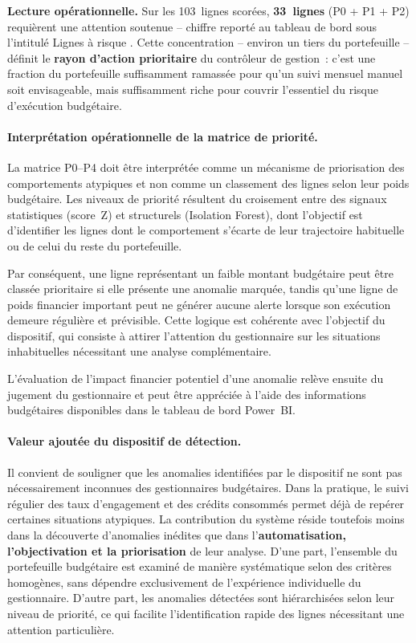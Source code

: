 \textbf{Lecture op\'erationnelle.} Sur les 103~lignes scor\'ees,
\textbf{33~lignes} (P0 + P1 + P2) requi\`erent une attention soutenue --
chiffre report\'e au tableau de bord sous l'intitul\'e \og Lignes \`a
risque \fg{}. Cette concentration -- environ un tiers du portefeuille --
d\'efinit le \textbf{rayon d'action prioritaire} du contr\^oleur de
gestion~: c'est une fraction du portefeuille suffisamment ramass\'ee pour
qu'un suivi mensuel manuel soit envisageable, mais suffisamment riche pour
couvrir l'essentiel du risque d'ex\'ecution budg\'etaire.

\paragraph{Interpr\'etation op\'erationnelle de la matrice de priorit\'e.}
La matrice P0--P4 doit \^etre interpr\'et\'ee comme un m\'ecanisme de
priorisation des comportements atypiques et non comme un classement des
lignes selon leur poids budg\'etaire. Les niveaux de priorit\'e r\'esultent
du croisement entre des signaux statistiques (score~Z) et structurels
(Isolation Forest), dont l'objectif est d'identifier les lignes dont le
comportement s'\'ecarte de leur trajectoire habituelle ou de celui du
reste du portefeuille.

Par cons\'equent, une ligne repr\'esentant un faible montant budg\'etaire
peut \^etre class\'ee prioritaire si elle pr\'esente une anomalie marqu\'ee,
tandis qu'une ligne de poids financier important peut ne g\'en\'erer aucune
alerte lorsque son ex\'ecution demeure r\'eguli\`ere et pr\'evisible. Cette
logique est coh\'erente avec l'objectif du dispositif, qui consiste \`a
attirer l'attention du gestionnaire sur les situations inhabituelles
n\'ecessitant une analyse compl\'ementaire.

L'\'evaluation de l'impact financier potentiel d'une anomalie rel\`eve
ensuite du jugement du gestionnaire et peut \^etre appr\'eci\'ee \`a
l'aide des informations budg\'etaires disponibles dans le tableau de
bord Power~BI.

\paragraph{Valeur ajout\'ee du dispositif de d\'etection.}
Il convient de souligner que les anomalies identifi\'ees par le dispositif
ne sont pas n\'ecessairement inconnues des gestionnaires budg\'etaires.
Dans la pratique, le suivi r\'egulier des taux d'engagement et des cr\'edits
consomm\'es permet d\'ej\`a de rep\'erer certaines situations atypiques.
La contribution du syst\`eme r\'eside toutefois moins dans la d\'ecouverte
d'anomalies in\'edites que dans l'\textbf{automatisation, l'objectivation
et la priorisation} de leur analyse. D'une part, l'ensemble du portefeuille
budg\'etaire est examin\'e de mani\`ere syst\'ematique selon des crit\`eres
homog\`enes, sans d\'ependre exclusivement de l'exp\'erience individuelle
du gestionnaire. D'autre part, les anomalies d\'etect\'ees sont
hi\'erarchis\'ees selon leur niveau de priorit\'e, ce qui facilite
l'identification rapide des lignes n\'ecessitant une attention particuli\`ere.

